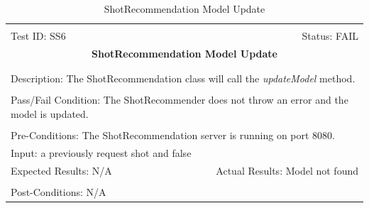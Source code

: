 \documentclass[11pt]{article}
\begin{document}
\begin{center}
\begin{table}[H]
\begin{tabular}{|l r|}\hline&\\[-2mm]
	Test ID: SS6	&Status: FAIL\\[-3mm]
	\multicolumn{2}{|c|}{\textbf{\large{ShotRecommendation Model Update}}}\\&\\\hline&\\[-3mm]
	\multicolumn{2}{|p{\textwidth}|}{Description: The ShotRecommendation class will call the \textit{updateModel} method.}\\[1mm]\hline&\\[-3mm]
	\multicolumn{2}{|p{\textwidth}|}{Pass/Fail Condition: The ShotRecommender does not throw an error and the model is updated.}\\[1mm]\hline&\\[-3mm]
	\multicolumn{2}{|p{\textwidth}|}{Pre-Conditions: The ShotRecommendation server is running on port 8080.}\\[4mm]
	\multicolumn{2}{|p{\textwidth}|}{Input: a previously request shot and false}\\[2mm]\hline
	\multicolumn{1}{|p{0.49\textwidth}}{Expected Results: N/A}	&\multicolumn{1}{|p{0.45\textwidth}|}{Actual Results: Model not found}\\\hline&\\[-3mm]
	\multicolumn{2}{|p{\textwidth}|}{Post-Conditions: N/A}\\\hline
\end{tabular}
\caption{ShotRecommendation Model Update}
\end{table}
\end{center}
\end{document}

